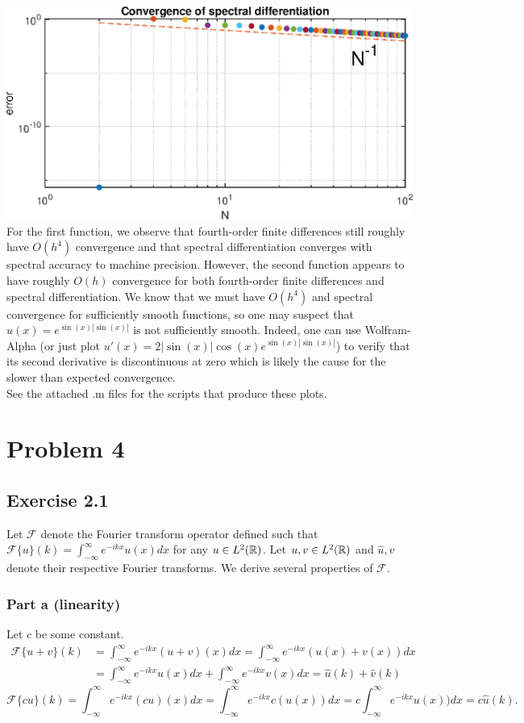 \documentclass{article}
\begin{document}
\includegraphics[]{p2b.eps}\\
For the first function, we observe that fourth-order finite differences still roughly have $O(h^4)$ convergence and that spectral differentiation converges with spectral accuracy to machine precision. However, the second function appears to have roughly $O(h)$ convergence for both fourth-order finite differences and spectral differentiation. We know that we must have $O(h^4)$ and spectral convergence for sufficiently smooth functions, so one may suspect that $u(x)=e^{\sin(x)|\sin(x)|}$ is not sufficiently smooth. Indeed, one can use Wolfram-Alpha (or just plot $u'(x)=2|\sin(x)|\cos(x)e^{\sin(x)|\sin(x)|}$) to verify that its second derivative is discontinuous at zero which is likely the cause for the slower than expected convergence. 
\\See the attached .m files for the scripts that produce these plots. 
\section{Problem 4}
\subsection{Exercise 2.1}
Let $\mathcal{F}$ denote the Fourier transform operator defined such that $\mathcal{F}\{u\}(k)=\int_{-\infty}^\infty e^{-ikx}u(x)dx$ for any $u\in L^2(\mathbb{R})$. Let $u,v\in L^2(\mathbb{R})$ and $\hat{u},\hat{v}$ denote their respective Fourier transforms. We derive several properties of $\mathcal{F}$.
\subsubsection{Part a (linearity)}
Let $c$ be some constant.\\
\[
\begin{split}
\mathcal{F}\{u+v\}(k)&=\int_{-\infty}^\infty e^{-ikx}(u+v)(x)dx=\int_{-\infty}^\infty e^{-ikx}(u(x)+v(x))dx\\&=\int_{-\infty}^\infty e^{-ikx}u(x)dx+\int_{-\infty}^\infty e^{-ikx}v(x)dx=\hat{u}(k)+\hat{v}(k)
\end{split}
\]
\[
\mathcal{F}\{cu\}(k)=\int_{-\infty}^\infty e^{-ikx}(cu)(x)dx=\int_{-\infty}^\infty e^{-ikx}c(u(x))dx=c\int_{-\infty}^\infty e^{-ikx}u(x))dx=c\hat{u}(k).
\]
\end{document}
